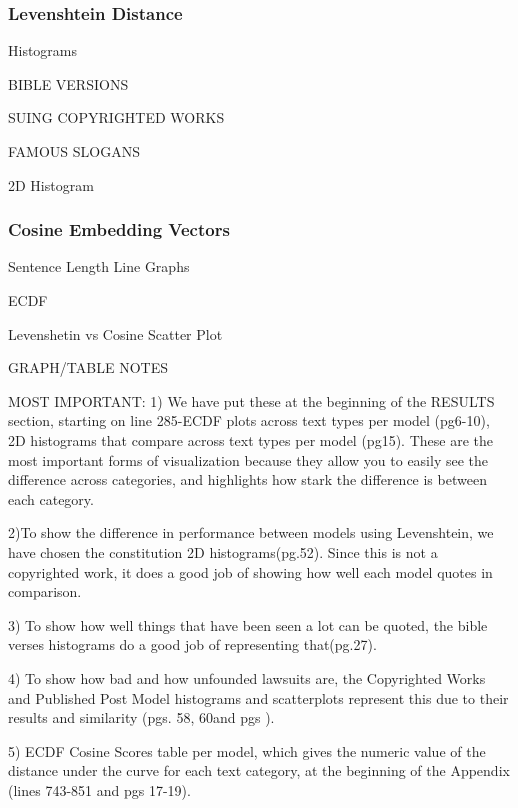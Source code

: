 \documentclass{article}
\begin{document}
\subsubsection{Levenshtein Distance}

Histograms

BIBLE VERSIONS 



SUING COPYRIGHTED WORKS 



FAMOUS SLOGANS



2D Histogram






\subsubsection{Cosine Embedding Vectors}
Sentence Length Line Graphs




ECDF


Levenshetin vs Cosine Scatter Plot




GRAPH/TABLE NOTES

MOST IMPORTANT: 
1) We have put these at the beginning of the RESULTS section, starting on line 285-ECDF plots across text types per model (pg6-10), 2D histograms that compare across text types per model (pg15). These are the most important forms of visualization because they allow you to easily see the difference across categories, and highlights how stark the difference is between each category. 

2)To show the difference in performance between models using Levenshtein, we have chosen the constitution 2D histograms(pg.52). Since this is not a copyrighted work, it does a good job of showing how well each model quotes in comparison. 

3) To show how well things that have been seen a lot can be quoted, the bible verses histograms do a good job of representing that(pg.27).

4) To show how bad and how unfounded lawsuits are, the Copyrighted Works and Published Post Model histograms and scatterplots represent this due to their results and similarity (pgs. 58, 60and pgs ). 

5) ECDF Cosine Scores table per model, which gives the numeric value of the distance under the curve for each text category, at the beginning of the Appendix (lines 743-851 and pgs 17-19). 
\end{document}
